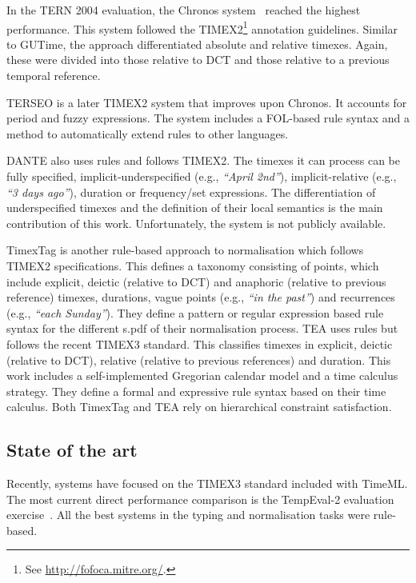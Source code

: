 \documentclass[10pt, a4paper]{article}
\begin{document}
In the TERN 2004 evaluation, the Chronos system~\cite{Negri2004TERN} reached the highest performance.
 This system followed the TIMEX2\footnote{See \url{http://fofoca.mitre.org/}.} annotation guidelines.
Similar to GUTime, the approach differentiated absolute and relative timexes. Again, these were divided into those relative to DCT and those relative to a previous temporal reference.

TERSEO \cite{Saquete2006TERSEO} is a later TIMEX2 system that improves upon Chronos. It accounts for period and fuzzy expressions. The system includes a FOL-based rule syntax and a method to automatically extend rules to other languages.

DANTE \cite{Mazur-Dale2007-DANTE} also uses rules and follows TIMEX2. The timexes it can process can be fully specified, implicit-underspecified  (e.g., \emph{``April 2nd''}), implicit-relative (e.g., \emph{``3 days ago''}), duration or frequency/set expressions. The differentiation of underspecified timexes and the definition of their local semantics is the main contribution of this work. Unfortunately, the system is not publicly available.

TimexTag \cite{Ahn2005-CRF} is another rule-based approach to normalisation which follows TIMEX2 specifications. This defines a taxonomy consisting of points, which include explicit, deictic (relative to DCT) and anaphoric (relative to previous reference) timexes, durations, vague points (e.g., \emph{``in the past''}) and recurrences (e.g., \emph{``each Sunday''}). They define a pattern or regular expression based rule syntax for the different s.pdf of their normalisation process. TEA \cite{Han-Levin2006-TEA} uses rules but follows the recent TIMEX3 standard. This classifies timexes in explicit, deictic (relative to DCT), relative (relative to previous references) and duration. This work includes a self-implemented Gregorian calendar model and a time calculus strategy. They define a formal and expressive rule syntax based on their time calculus. Both TimexTag and TEA rely on hierarchical constraint satisfaction.

\subsection{State of the art}

Recently, systems have focused on the TIMEX3 standard included with TimeML. The most current direct performance comparison is the TempEval-2 evaluation exercise~\cite{Verhagen2010-TempEval-2}. All the best systems in the typing and normalisation tasks were rule-based.
\end{document}
